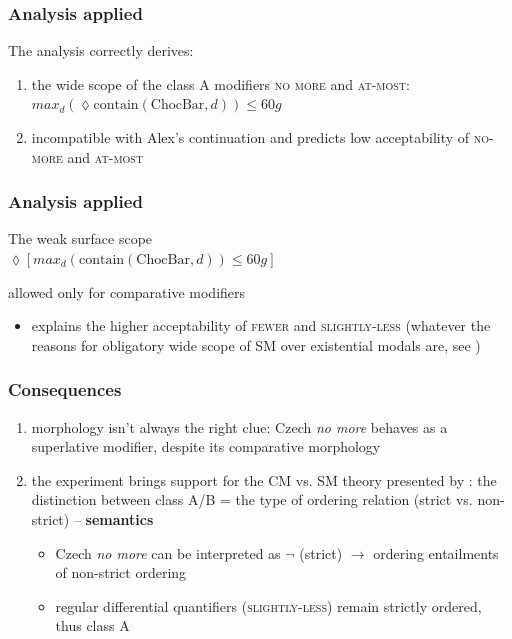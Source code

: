 \documentclass[10pt
]{beamer}
\newcommand{\cond}[1]{\textsc{#1}}
\begin{document}
\begin{frame}
  \frametitle{Analysis applied}


  The analysis correctly derives:
  
  \begin{enumerate}
    \item the wide scope of the class A modifiers \cond{no more} and \cond{at-most}:\\
    
    
    \ex $max_d(\lozenge \mathrm{contain}(\mathrm{ChocBar},d)) \leq 60g$
    \xe

    \item incompatible with Alex's continuation and predicts low acceptability of \cond{no-more} and \cond{at-most}
  \end{enumerate}

\end{frame}

\begin{frame}
  \frametitle{Analysis applied}

  The weak surface scope\\
  
  \ex $\lozenge[max_d(\mathrm{contain}(\mathrm{ChocBar},d)) \leq 60g]$
  \xe

  allowed only for comparative modifiers
  
\begin{itemize}
  \item explains the higher acceptability of \cond{fewer} and
  \cond{slightly-less} (whatever the reasons for obligatory wide scope of SM over existential modals are, see \cite{blok2019scope})
\end{itemize}
  
\end{frame}

\begin{frame}
  \frametitle{Consequences}

\begin{enumerate}
  \item morphology isn't always the right clue: Czech \textit{no more} behaves as a superlative modifier, despite its comparative morphology
  \item the experiment brings support for the CM vs. SM theory presented by \cite{kennedy2015fregean}: the distinction between class A/B = the type of ordering relation (strict vs. non-strict) -- \textbf{semantics}

  \begin{itemize}
    \item Czech \textit{no more} can be interpreted as $\neg$ (strict) $\rightarrow$ ordering entailments of non-strict ordering
    \item regular differential quantifiers (\cond{slightly-less}) remain strictly ordered, thus class A
  \end{itemize}

\end{enumerate}

\end{frame}
\end{document}
